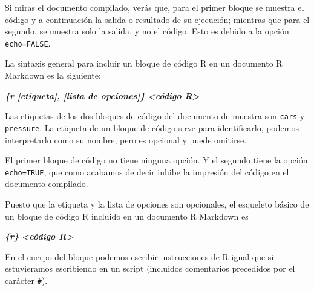 \documentclass[
  title=normal,
  notoc,
  bib=normal]{mnye}
\newenvironment{Shaded}{\begin{snugshade}}{\end{snugshade}}
\newcommand{\InformationTok}[1]{\textcolor[rgb]{0.56,0.35,0.01}{\textbf{\textit{#1}}}}
\begin{document}
Si miras el documento compilado, verás que, para el primer bloque se muestra el código y a continuación la salida o resultado de su ejecución; mientras que para el segundo, se muestra solo la salida, y no el código. Esto es debido a la opción \texttt{echo=FALSE}.

La sintaxis general para incluir un bloque de código \textsf{R} en un documento R Markdown es la siguiente:

\begin{Shaded}
\begin{Highlighting}[]
\InformationTok{\textasciigrave{}\textasciigrave{}\textasciigrave{}\{r [etiqueta], [lista de opciones]\}}
\InformationTok{\textless{}código R\textgreater{}}
\InformationTok{\textasciigrave{}\textasciigrave{}\textasciigrave{}}
\end{Highlighting}
\end{Shaded}

Las etiquetas de los dos bloques de código del documento de muestra son \texttt{cars} y \texttt{pressure}. La etiqueta de un bloque de código sirve para identificarlo, podemos interpretarlo como su nombre, pero es opcional y puede omitirse.

El primer bloque de código no tiene ninguna opción. Y el segundo tiene la opción \texttt{echo=TRUE}, que como acabamos de decir inhibe la impresión del código en el documento compilado.

Puesto que la etiqueta y la lista de opciones son opcionales, el esqueleto básico de un bloque de código \textsf{R} incluido en un documento R Markdown es

\begin{Shaded}
\begin{Highlighting}[]
\InformationTok{\textasciigrave{}\textasciigrave{}\textasciigrave{}\{r\}}
\InformationTok{\textless{}código R\textgreater{}}
\InformationTok{\textasciigrave{}\textasciigrave{}\textasciigrave{}}
\end{Highlighting}
\end{Shaded}

En el cuerpo del bloque podemos escribir instrucciones de \textsf{R} igual que si estuvieramos escribiendo en un script (incluidos comentarios precedidos por el carácter \texttt{\#}).
\end{document}
